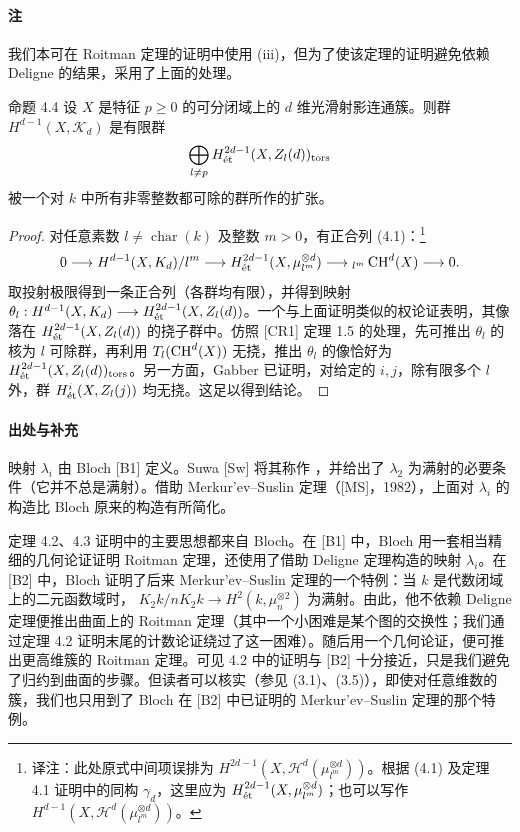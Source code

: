 \paragraph{注}
我们本可在 Roitman 定理的证明中使用 (iii)，但为了使该定理的证明避免依赖 Deligne 的结果，采用了上面的处理。

\begin{statement}{命题 4.4}
设 $X$ 是特征 $p\ge0$ 的可分闭域上的 $d$ 维光滑射影连通簇。则群 $H^{d-1}(X,\mathcal K_d)$ 是有限群
\[
\bigoplus_{l\ne p}H^{2d-1}_{\mathrm{\acute et}}(X,Z_l(d))_{\mathrm{tors}}
\]
被一个对 $k$ 中所有非零整数都可除的群所作的扩张。
\end{statement}
\begin{proof}
对任意素数 $l\ne\operatorname{char}(k)$ 及整数 $m>0$，有正合列 (4.1)：\footnote{译注：此处原式中间项误排为 $H^{2d-1}(X,\mathcal H^d(\mu_{l^m}^{\otimes d}))$。根据 (4.1) 及定理 4.1 证明中的同构 $\gamma_d$，这里应为 $H^{2d-1}_{\mathrm{\acute et}}(X,\mu_{l^m}^{\otimes d})$；也可以写作 $H^{d-1}(X,\mathcal H^d(\mu_{l^m}^{\otimes d}))$。}
\[
0\longrightarrow H^{d-1}(X,K_d)/l^m\longrightarrow H^{2d-1}_{\mathrm{\acute et}}(X,\mu_{l^m}^{\otimes d})\longrightarrow{}_{l^m}\operatorname{CH}^d(X)\longrightarrow0.
\]
取投射极限得到一条正合列（各群均有限），并得到映射 $\theta_l:H^{d-1}(X,K_d)\longrightarrow H^{2d-1}_{\mathrm{\acute et}}(X,Z_l(d))$。一个与上面证明类似的权论证表明，其像落在 $H^{2d-1}_{\mathrm{\acute et}}(X,Z_l(d))$ 的挠子群中。仿照 [CR1] 定理 1.5 的处理，先可推出 $\theta_l$ 的核为 $l$ 可除群，再利用  $T_l(\operatorname{CH}^d(X))$ 无挠，推出 $\theta_l$ 的像恰好为 $H^{2d-1}_{\mathrm{\acute et}}(X,Z_l(d))_{\mathrm{tors}}$。另一方面，Gabber 已证明，对给定的 $i,j$，除有限多个 $l$ 外，群 $H^i_{\mathrm{\acute et}}(X,Z_l(j))$ 均无挠。这足以得到结论。
\end{proof}

\paragraph{出处与补充}
映射 $\lambda_i$ 由 Bloch [B1] 定义。Suwa [Sw] 将其称作 ，并给出了 $\lambda_2$ 为满射的必要条件（它并不总是满射）。借助 Merkur'ev--Suslin 定理（[MS]，1982），上面对 $\lambda_i$ 的构造比 Bloch 原来的构造有所简化。

定理 4.2、4.3 证明中的主要思想都来自 Bloch。在 [B1] 中，Bloch 用一套相当精细的几何论证证明 Roitman 定理，还使用了借助 Deligne 定理构造的映射 $\lambda_i$。在 [B2] 中，Bloch 证明了后来 Merkur'ev--Suslin 定理的一个特例：当 $k$ 是代数闭域上的二元函数域时， $K_2k/nK_2k\longrightarrow H^2(k,\mu_n^{\otimes2})$ 为满射。由此，他不依赖 Deligne 定理便推出曲面上的 Roitman 定理（其中一个小困难是某个图的交换性；我们通过定理 4.2 证明末尾的计数论证绕过了这一困难）。随后用一个几何论证，便可推出更高维簇的 Roitman 定理。可见 4.2 中的证明与 [B2] 十分接近，只是我们避免了归约到曲面的步骤。但读者可以核实（参见 (3.1)、(3.5)），即使对任意维数的簇，我们也只用到了 Bloch 在 [B2] 中已证明的 Merkur'ev--Suslin 定理的那个特例。

